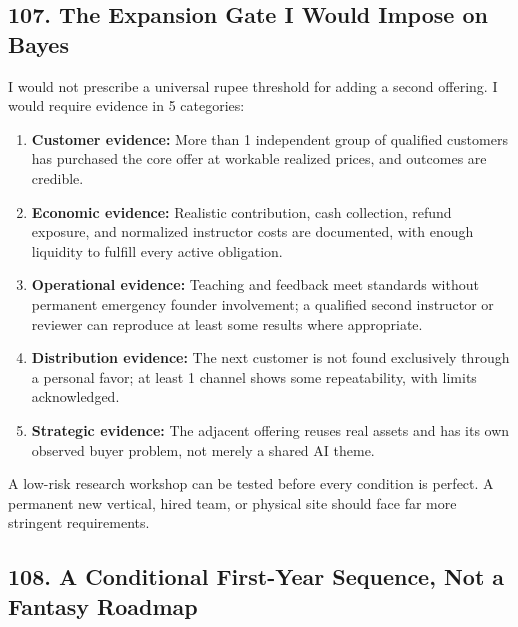 \subsection*{107. The Expansion Gate I Would Impose on Bayes}

I would not prescribe a universal rupee threshold for adding a second offering. I would require evidence in 5 categories:

\begin{enumerate}
    \item \textbf{Customer evidence:} More than 1 independent group of qualified customers has purchased the core offer at workable realized prices, and outcomes are credible.
    \item \textbf{Economic evidence:} Realistic contribution, cash collection, refund exposure, and normalized instructor costs are documented, with enough liquidity to fulfill every active obligation.
    \item \textbf{Operational evidence:} Teaching and feedback meet standards without permanent emergency founder involvement; a qualified second instructor or reviewer can reproduce at least some results where appropriate.
    \item \textbf{Distribution evidence:} The next customer is not found exclusively through a personal favor; at least 1 channel shows some repeatability, with limits acknowledged.
    \item \textbf{Strategic evidence:} The adjacent offering reuses real assets and has its own observed buyer problem, not merely a shared AI theme.
\end{enumerate}

A low-risk research workshop can be tested before every condition is perfect. A permanent new vertical, hired team, or physical site should face far more stringent requirements.

\subsection*{108. A Conditional First-Year Sequence, Not a Fantasy Roadmap}

